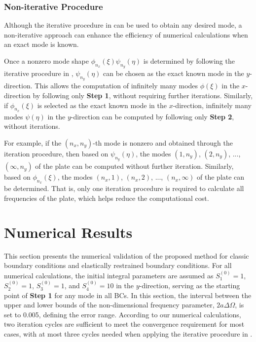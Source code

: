 \documentclass[preprint,12pt]{elsarticle}
\begin{document}
\subsubsection{Non-iterative Procedure}\label{sec:Noniterative_procedure}  
Although the iterative procedure in  can be used to obtain any desired mode, a non-iterative approach can enhance the efficiency of numerical calculations when an exact mode is known.  

Once a nonzero mode shape \(\phi_{n_x}(\xi) \psi_{n_y}(\eta)\) is determined by following the iterative procedure in , \(\psi_{n_y}(\eta)\) can be chosen as the exact known mode in the \(y\)-direction.  
This allows the computation of infinitely many modes \(\phi(\xi)\) in the \(x\)-direction by following only \textbf{Step 1}, without requiring further iterations.  
Similarly, if \(\phi_{n_x}(\xi)\) is selected as the exact known mode in the \(x\)-direction, infinitely many modes \(\psi(\eta)\) in the \(y\)-direction can be computed by following only \textbf{Step 2}, without iterations.  

For example, if the \((n_x, n_y)\)-th mode is nonzero and obtained through the iteration procedure, then based on \(\psi_{n_y}(\eta)\), the modes \((1,n_y)\), \((2,n_y)\), ..., \((\infty,n_y)\) of the plate can be computed without further iteration.  
Similarly, based on \(\phi_{n_x}(\xi)\), the modes \((n_x,1)\), \((n_x,2)\), ..., \((n_x,\infty)\) of the plate can be determined.  
That is, only one iteration procedure is required to calculate all frequencies of the plate, which helps reduce the computational cost.




\FloatBarrier
\section{Numerical Results}  
This section presents the numerical validation of the proposed method for classic boundary conditions and elastically restrained boundary conditions.  
For all numerical calculations, the initial integral parameters are assumed as \(S^{(0)}_1=1\), \(S^{(0)}_2=1\), \(S^{(0)}_3=1\), and \(S^{(0)}_4=10\) in the \(y\)-direction, serving as the starting point of \textbf{Step 1} for any mode in all BCs.  
In this section, the interval between the upper and lower bounds of the non-dimensional frequency parameter, \(2a\Delta\Omega\), is set to 0.005, defining the error range.  
According to our numerical calculations, two iteration cycles are sufficient to meet the convergence requirement for most cases, with at most three cycles needed when applying the iterative procedure in .  
 
\end{document}
